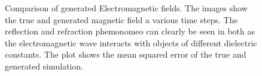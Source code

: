 \documentclass{article}
\begin{document}
\begin{figure}[!t]
\caption{ Comparison of generated Electromagnetic fields. The images show the true and generated magnetic field a various time steps. The reflection and refraction phemonomeo can clearly be seen in both as the electromagnetic wave interacts with objects of different dielectric constants. The plot shows the mean squared error of the true and generated simulation.}
\label{em_dataset}
\end{figure}
\end{document}

